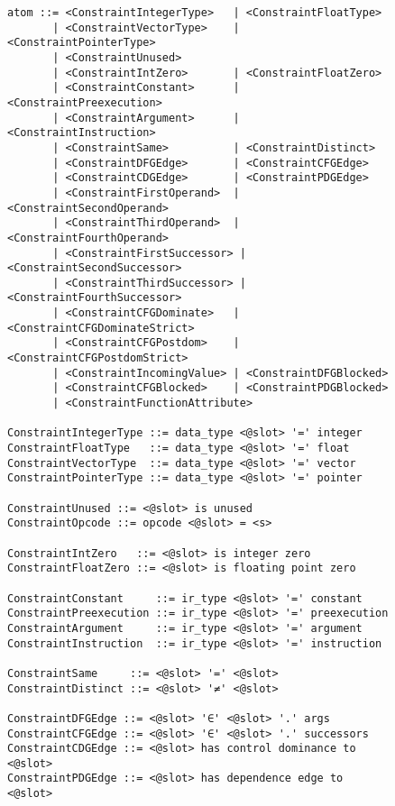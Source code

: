 \begin{figure}[p]
\begin{lstlisting}[language=BNF,basicstyle=\linespread{0.85}\small\ttfamily,
                   firstnumber=41]
atom ::= <ConstraintIntegerType>   | <ConstraintFloatType>
       | <ConstraintVectorType>    | <ConstraintPointerType>
       | <ConstraintUnused>
       | <ConstraintIntZero>       | <ConstraintFloatZero>
       | <ConstraintConstant>      | <ConstraintPreexecution>
       | <ConstraintArgument>      | <ConstraintInstruction>
       | <ConstraintSame>          | <ConstraintDistinct>
       | <ConstraintDFGEdge>       | <ConstraintCFGEdge>
       | <ConstraintCDGEdge>       | <ConstraintPDGEdge>
       | <ConstraintFirstOperand>  | <ConstraintSecondOperand>
       | <ConstraintThirdOperand>  | <ConstraintFourthOperand>
       | <ConstraintFirstSuccessor> | <ConstraintSecondSuccessor>
       | <ConstraintThirdSuccessor> | <ConstraintFourthSuccessor>
       | <ConstraintCFGDominate>   | <ConstraintCFGDominateStrict>
       | <ConstraintCFGPostdom>    | <ConstraintCFGPostdomStrict>
       | <ConstraintIncomingValue> | <ConstraintDFGBlocked>
       | <ConstraintCFGBlocked>    | <ConstraintPDGBlocked>
       | <ConstraintFunctionAttribute>

ConstraintIntegerType ::= data_type <@slot> '=' integer
ConstraintFloatType   ::= data_type <@slot> '=' float
ConstraintVectorType  ::= data_type <@slot> '=' vector
ConstraintPointerType ::= data_type <@slot> '=' pointer

ConstraintUnused ::= <@slot> is unused
ConstraintOpcode ::= opcode <@slot> = <s>

ConstraintIntZero   ::= <@slot> is integer zero
ConstraintFloatZero ::= <@slot> is floating point zero

ConstraintConstant     ::= ir_type <@slot> '=' constant
ConstraintPreexecution ::= ir_type <@slot> '=' preexecution
ConstraintArgument     ::= ir_type <@slot> '=' argument
ConstraintInstruction  ::= ir_type <@slot> '=' instruction

ConstraintSame     ::= <@slot> '=' <@slot>
ConstraintDistinct ::= <@slot> '≠' <@slot>

ConstraintDFGEdge ::= <@slot> '∈' <@slot> '.' args
ConstraintCFGEdge ::= <@slot> '∈' <@slot> '.' successors
ConstraintCDGEdge ::= <@slot> has control dominance to <@slot>
ConstraintPDGEdge ::= <@slot> has dependence edge to <@slot>


\end{lstlisting}
\end{figure}
